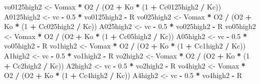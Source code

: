 \documentclass[
]{krantz}
\makeatletter
\newenvironment{Shaded}{\begin{snugshade}}{\end{snugshade}}
\newcommand{\DecValTok}[1]{\textcolor[rgb]{0.00,0.00,0.81}{#1}}
\newcommand{\FloatTok}[1]{\textcolor[rgb]{0.00,0.00,0.81}{#1}}
\newcommand{\NormalTok}[1]{#1}
\newcommand{\OperatorTok}[1]{\textcolor[rgb]{0.81,0.36,0.00}{\textbf{#1}}}
\newcommand{\StringTok}[1]{\textcolor[rgb]{0.31,0.60,0.02}{#1}}
\newenvironment{kframe}{%
\medskip{}
\setlength{\fboxsep}{.8em}
 \def\at@end@of@kframe{}%
 \ifinner\ifhmode%
  \def\at@end@of@kframe{\end{minipage}}%
  \begin{minipage}{\columnwidth}%
 \fi\fi%
 \def\FrameCommand##1{\hskip\@totalleftmargin \hskip-\fboxsep
 \colorbox{shadecolor}{##1}\hskip-\fboxsep
     \hskip-\linewidth \hskip-\@totalleftmargin \hskip\columnwidth}%
 \MakeFramed {\advance\hsize-\width
   \@totalleftmargin\z@ \linewidth\hsize
   \@setminipage}}%
 {\par\unskip\endMakeFramed%
 \at@end@of@kframe}
\renewenvironment{Shaded}{\begin{kframe}}{\end{kframe}}
\makeatother
\begin{document}
\begin{Shaded}
\begin{Highlighting}[]
\NormalTok{vo0125high2 <-}\StringTok{ }\NormalTok{Vomax }\OperatorTok{*}\StringTok{ }\NormalTok{O2 }\OperatorTok{/}\StringTok{ }\NormalTok{(O2 }\OperatorTok{+}\StringTok{ }\NormalTok{Ko }\OperatorTok{*}\StringTok{ }\NormalTok{(}\DecValTok{1} \OperatorTok{+}\StringTok{ }\NormalTok{Cc0125high2 }\OperatorTok{/}\StringTok{ }\NormalTok{Kc)) }
\NormalTok{A0125high2 <-}\StringTok{ }\NormalTok{vc }\OperatorTok{-}\StringTok{ }\FloatTok{0.5} \OperatorTok{*}\StringTok{ }\NormalTok{vo0125high2 }\OperatorTok{-}\StringTok{ }\NormalTok{R }
\NormalTok{vo025high2 <-}\StringTok{ }\NormalTok{Vomax }\OperatorTok{*}\StringTok{ }\NormalTok{O2 }\OperatorTok{/}\StringTok{ }\NormalTok{(O2 }\OperatorTok{+}\StringTok{ }\NormalTok{Ko }\OperatorTok{*}\StringTok{ }\NormalTok{(}\DecValTok{1} \OperatorTok{+}\StringTok{ }\NormalTok{Cc025high2 }\OperatorTok{/}\StringTok{ }\NormalTok{Kc)) }
\NormalTok{A025high2 <-}\StringTok{ }\NormalTok{vc }\OperatorTok{-}\StringTok{ }\FloatTok{0.5} \OperatorTok{*}\StringTok{ }\NormalTok{vo025high2 }\OperatorTok{-}\StringTok{ }\NormalTok{R }
\NormalTok{vo05high2 <-}\StringTok{ }\NormalTok{Vomax }\OperatorTok{*}\StringTok{ }\NormalTok{O2 }\OperatorTok{/}\StringTok{ }\NormalTok{(O2 }\OperatorTok{+}\StringTok{ }\NormalTok{Ko }\OperatorTok{*}\StringTok{ }\NormalTok{(}\DecValTok{1} \OperatorTok{+}\StringTok{ }\NormalTok{Cc05high2 }\OperatorTok{/}\StringTok{ }\NormalTok{Kc)) }
\NormalTok{A05high2 <-}\StringTok{ }\NormalTok{vc }\OperatorTok{-}\StringTok{ }\FloatTok{0.5} \OperatorTok{*}\StringTok{ }\NormalTok{vo05high2 }\OperatorTok{-}\StringTok{ }\NormalTok{R }
\NormalTok{vo1high2 <-}\StringTok{ }\NormalTok{Vomax }\OperatorTok{*}\StringTok{ }\NormalTok{O2 }\OperatorTok{/}\StringTok{ }\NormalTok{(O2 }\OperatorTok{+}\StringTok{ }\NormalTok{Ko }\OperatorTok{*}\StringTok{ }\NormalTok{(}\DecValTok{1} \OperatorTok{+}\StringTok{ }\NormalTok{Cc1high2 }\OperatorTok{/}\StringTok{ }\NormalTok{Kc)) }
\NormalTok{A1high2 <-}\StringTok{ }\NormalTok{vc }\OperatorTok{-}\StringTok{ }\FloatTok{0.5} \OperatorTok{*}\StringTok{ }\NormalTok{vo1high2 }\OperatorTok{-}\StringTok{ }\NormalTok{R }
\NormalTok{vo2high2 <-}\StringTok{ }\NormalTok{Vomax }\OperatorTok{*}\StringTok{ }\NormalTok{O2 }\OperatorTok{/}\StringTok{ }\NormalTok{(O2 }\OperatorTok{+}\StringTok{ }\NormalTok{Ko }\OperatorTok{*}\StringTok{ }\NormalTok{(}\DecValTok{1} \OperatorTok{+}\StringTok{ }\NormalTok{Cc2high2 }\OperatorTok{/}\StringTok{ }\NormalTok{Kc)) }
\NormalTok{A2high2 <-}\StringTok{ }\NormalTok{vc }\OperatorTok{-}\StringTok{ }\FloatTok{0.5} \OperatorTok{*}\StringTok{ }\NormalTok{vo2high2 }\OperatorTok{-}\StringTok{ }\NormalTok{R }
\NormalTok{vo4high2 <-}\StringTok{ }\NormalTok{Vomax }\OperatorTok{*}\StringTok{ }\NormalTok{O2 }\OperatorTok{/}\StringTok{ }\NormalTok{(O2 }\OperatorTok{+}\StringTok{ }\NormalTok{Ko }\OperatorTok{*}\StringTok{ }\NormalTok{(}\DecValTok{1} \OperatorTok{+}\StringTok{ }\NormalTok{Cc4high2 }\OperatorTok{/}\StringTok{ }\NormalTok{Kc)) }
\NormalTok{A4high2 <-}\StringTok{ }\NormalTok{vc }\OperatorTok{-}\StringTok{ }\FloatTok{0.5} \OperatorTok{*}\StringTok{ }\NormalTok{vo4high2 }\OperatorTok{-}\StringTok{ }\NormalTok{R }


\end{Highlighting}
\end{Shaded}
\end{document}
